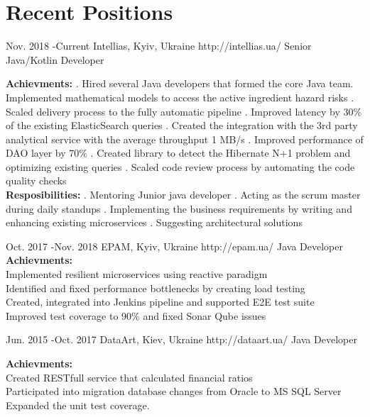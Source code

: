 \documentclass[10pt]{article} %
\begin{document}
\section{Recent Positions}
\job
{Nov. 2018 -}{Current}
{Intellias, Kyiv, Ukraine}
{http://intellias.ua/}
{Senior Java/Kotlin Developer}
{
\rule{0mm}{5mm}
\textbf{Achievments:} . Hired several Java developers that formed the core Java team. Implemented mathematical models to access the active ingredient hazard risks . Scaled delivery process to the fully automatic pipeline . Improved latency by 30\% of the existing ElasticSearch queries . Created the integration with the 3rd party analytical service with the average throughput 1 MB/s . Improved performance of DAO layer by 70\%  . Created library to detect the Hibernate N+1 problem and optimizing existing queries . Scaled code review process by automating the code quality checks 
\\ \textbf{Resposibilities:} . Mentoring Junior java developer . Acting as the scrum master during daily standups . Implementing the business requirements by writing and enhancing existing microservices . Suggesting architectural solutions
 }
 
\job
{Oct. 2017 -}{Nov. 2018}
{EPAM, Kyiv, Ukraine}
{http://epam.ua/}
{Java Developer}
{
\textbf{Achievments:}  
\\Implemented resilient microservices using reactive paradigm
\\Identified and fixed performance bottlenecks by creating load testing 
\\Created, integrated into Jenkins pipeline and supported E2E test suite
\\Improved test coverage to 90\% and fixed Sonar Qube issues
 }

\job
{Jun. 2015 -}{Oct. 2017}
{DataArt, Kiev, Ukraine}
{http://dataart.ua/}
{Java Developer}
{

\textbf{Achievments:}  
\\Created RESTfull service that calculated financial ratios
\\Participated into migration database changes from Oracle to MS SQL Server
\\Expanded the unit test coverage.
 }
\end{document}

